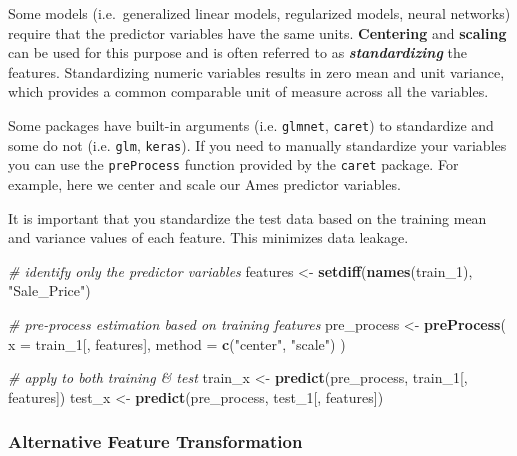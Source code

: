 \documentclass[]{book}
\newenvironment{Shaded}{\begin{snugshade}}{\end{snugshade}}
\newcommand{\CommentTok}[1]{\textcolor[rgb]{0.56,0.35,0.01}{\textit{#1}}}
\newcommand{\DataTypeTok}[1]{\textcolor[rgb]{0.13,0.29,0.53}{#1}}
\newcommand{\DecValTok}[1]{\textcolor[rgb]{0.00,0.00,0.81}{#1}}
\newcommand{\KeywordTok}[1]{\textcolor[rgb]{0.13,0.29,0.53}{\textbf{#1}}}
\newcommand{\NormalTok}[1]{#1}
\newcommand{\StringTok}[1]{\textcolor[rgb]{0.31,0.60,0.02}{#1}}
\theoremstyle{definition}
\theoremstyle{definition}
\theoremstyle{definition}
\theoremstyle{remark}
\begin{document}
Some models (i.e.~generalized linear models, regularized models, neural
networks) require that the predictor variables have the same units.
\textbf{Centering} and \textbf{scaling} can be used for this purpose and
is often referred to as \textbf{\emph{standardizing}} the features.
Standardizing numeric variables results in zero mean and unit variance,
which provides a common comparable unit of measure across all the
variables.

Some packages have built-in arguments (i.e. \texttt{glmnet},
\texttt{caret}) to standardize and some do not (i.e. \texttt{glm},
\texttt{keras}). If you need to manually standardize your variables you
can use the \texttt{preProcess} function provided by the \texttt{caret}
package. For example, here we center and scale our Ames predictor
variables.

\begin{warning}
It is important that you standardize the test data based on the training
mean and variance values of each feature. This minimizes data leakage.
\end{warning}

\begin{Shaded}
\begin{Highlighting}[]
\CommentTok{# identify only the predictor variables}
\NormalTok{features <-}\StringTok{ }\KeywordTok{setdiff}\NormalTok{(}\KeywordTok{names}\NormalTok{(train_}\DecValTok{1}\NormalTok{), }\StringTok{"Sale_Price"}\NormalTok{)}

\CommentTok{# pre-process estimation based on training features}
\NormalTok{pre_process <-}\StringTok{ }\KeywordTok{preProcess}\NormalTok{(}
  \DataTypeTok{x      =}\NormalTok{ train_}\DecValTok{1}\NormalTok{[, features],}
  \DataTypeTok{method =} \KeywordTok{c}\NormalTok{(}\StringTok{"center"}\NormalTok{, }\StringTok{"scale"}\NormalTok{)    }
\NormalTok{  )}

\CommentTok{# apply to both training & test}
\NormalTok{train_x <-}\StringTok{ }\KeywordTok{predict}\NormalTok{(pre_process, train_}\DecValTok{1}\NormalTok{[, features])}
\NormalTok{test_x  <-}\StringTok{ }\KeywordTok{predict}\NormalTok{(pre_process, test_}\DecValTok{1}\NormalTok{[, features])}
\end{Highlighting}
\end{Shaded}

\hypertarget{alternative-feature-transformation}{%
\subsubsection{Alternative Feature
Transformation}\label{alternative-feature-transformation}}
\end{document}
